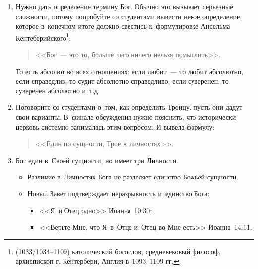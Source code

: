 \documentclass[a4paper,12pt]{article}
\begin{document}
\begin{enumerate}    
    \item Нужно дать определение термину Бог. Обычно это вызывает серьезные сложности, потому попробуйте со студентами вывести некое определение, которое в~конечном итоге должно свестись к~формулировке Ансельма Кентеберийского\footnote{(1033/1034--1109) католический богослов, средневековый философ, архиепископ г. К\'{е}нтербери, Англия в~1093--1109 гг.}:
    \begin{quote}
        <<Бог~--- это то, больше чего ничего нельзя помыслить>>.
    \end{quote} 
    То есть абсолют во всех отношениях: если любит~--- то любит абсолютно, если справедлив, то судит абсолютно справедливо, если суверенен, то суверенен абсолютно и~т.д.
    \item Поговорите со студентами о~том, как определить Троицу, пусть они дадут свои варианты. В~финале обсуждения нужно пояснить, что исторически церковь системно занималась этим вопросом. И вывела формулу: 
    \begin{quote}
    <<Един по сущности, Трое в~личностях>>.    
    \end{quote}
    
    \item Бог един в~Своей сущности, но имеет три Личности.
    
    \begin{itemize}
        \item Различие в~Личностях Бога не разделяет единство Божьей сущности.
        \item Новый Завет подтверждает неразрывность и~единство Бога:
        \begin{itemize}
            \item <<Я~и Отец одно>> Иоанна~10:30;
            \item <<Верьте Мне, что Я~в~Отце и~Отец во Мне есть>> Иоанна~14:11.
        \end{itemize}
    \end{itemize}
    

\end{enumerate}
\end{document}
